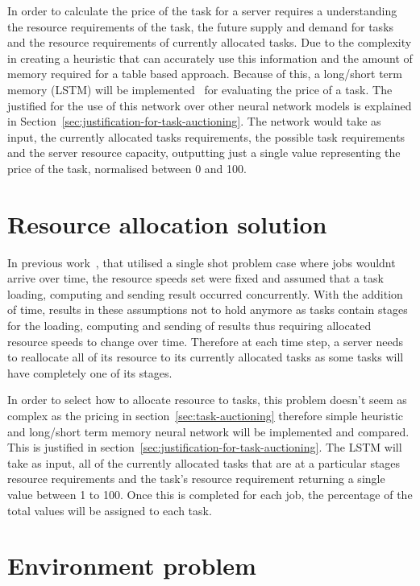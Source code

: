 In order to calculate the price of the task for a server requires a understanding the resource requirements of the task,
the future supply and demand for tasks and the resource requirements of currently allocated tasks. Due to the complexity
in creating a heuristic that can accurately use this information and the amount of memory required for a table based
approach. Because of this, a long/short term memory (LSTM) will be implemented~\citep{LSTM}  for evaluating the price
of a task. The justified for the use of this network over other neural network models is explained in
Section~\ref{sec:justification-for-task-auctioning}. The network would take as input, the currently
allocated tasks requirements, the possible task requirements and the server resource capacity, outputting just a single
value representing the price of the task, normalised between 0 and 100.

\section{Resource allocation solution}\label{sec:resource-allocation-solution}
In previous work~\citep{FlexibleResourceAllocation}, that utilised a single shot problem case where jobs wouldnt arrive
over time, the resource speeds set were fixed and assumed that a task loading, computing and sending result
occurred concurrently. With the addition of time, results in these assumptions not to hold anymore as tasks contain
stages for the loading, computing and sending of results thus requiring allocated resource speeds to change over time.
Therefore at each time step, a server needs to reallocate all of its resource to its currently allocated tasks as
some tasks will have completely one of its stages.

In order to select how to allocate resource to tasks, this problem doesn't seem as complex as the pricing in
section~\ref{sec:task-auctioning} therefore simple heuristic and long/short term memory neural network will be
implemented and compared. This is justified in section~\ref{sec:justification-for-task-auctioning}. The LSTM will take as input, all of
the currently allocated tasks that are at a particular stages resource requirements and the task's resource requirement
returning a single value between 1 to 100. Once this is completed for each job, the percentage of the total values will
be assigned to each task.

\section{Environment problem}\label{sec:markov-decision-process-description}
